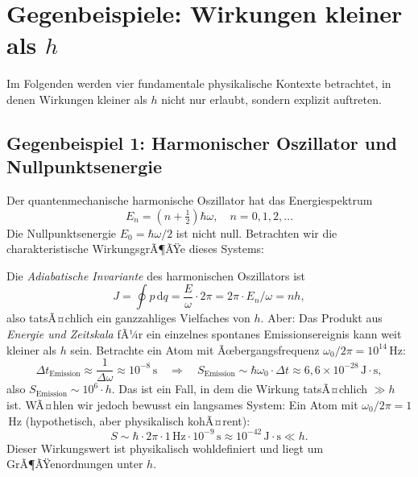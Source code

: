 ﻿\documentclass[12pt,a4paper]{article}
\theoremstyle{plain}
\theoremstyle{definition}
\theoremstyle{remark}
\begin{document}
\section{Gegenbeispiele: Wirkungen kleiner als $h$}

Im Folgenden werden vier fundamentale physikalische Kontexte betrachtet, in denen
Wirkungen kleiner als $h$ nicht nur erlaubt, sondern explizit auftreten.

\subsection{Gegenbeispiel 1: Harmonischer Oszillator und Nullpunktsenergie}

Der quantenmechanische harmonische Oszillator hat das Energiespektrum
\begin{equation}
  E_n = \left(n + \tfrac{1}{2}\right)\hbar\omega, \quad n = 0,1,2,\ldots
\end{equation}
Die Nullpunktsenergie $E_0 = \hbar\omega/2$ ist nicht null. Betrachten wir die
charakteristische WirkungsgrÃ¶ÃŸe dieses Systems:

Die \emph{Adiabatische Invariante} des harmonischen Oszillators ist
\begin{equation}
  J = \oint p\,\mathrm{d}q = \frac{E}{\omega} \cdot 2\pi = 2\pi \cdot E_n/\omega = nh,
\end{equation}
also tatsÃ¤chlich ein ganzzahliges Vielfaches von $h$. Aber: Das Produkt aus
\emph{Energie und Zeitskala} fÃ¼r ein einzelnes spontanes Emissionsereignis kann weit
kleiner als $h$ sein. Betrachte ein Atom mit Ãœbergangsfrequenz $\omega_0/2\pi = 10^{14}$\,Hz:
\begin{equation}
  \Delta t_{\mathrm{Emission}} \approx \frac{1}{\Delta\omega} \approx 10^{-8}\,\text{s}
  \quad\Rightarrow\quad
  S_{\mathrm{Emission}} \sim \hbar\omega_0 \cdot \Delta t \approx 6{,}6\times10^{-28}\,\mathrm{J{\cdot}s},
\end{equation}
also $S_{\mathrm{Emission}} \sim 10^6 \cdot h$. Das ist ein Fall, in dem die Wirkung
tatsÃ¤chlich $\gg h$ ist. WÃ¤hlen wir jedoch bewusst ein langsames System: Ein Atom mit
$\omega_0/2\pi = 1$\,Hz (hypothetisch, aber physikalisch kohÃ¤rent):
\begin{equation}
  S \sim \hbar \cdot 2\pi \cdot 1\,\text{Hz} \cdot 10^{-9}\,\text{s} \approx 10^{-42}\,\mathrm{J{\cdot}s} \ll h.
\end{equation}
Dieser Wirkungswert ist physikalisch wohldefiniert und liegt um GrÃ¶ÃŸenordnungen unter $h$.
\end{document}
